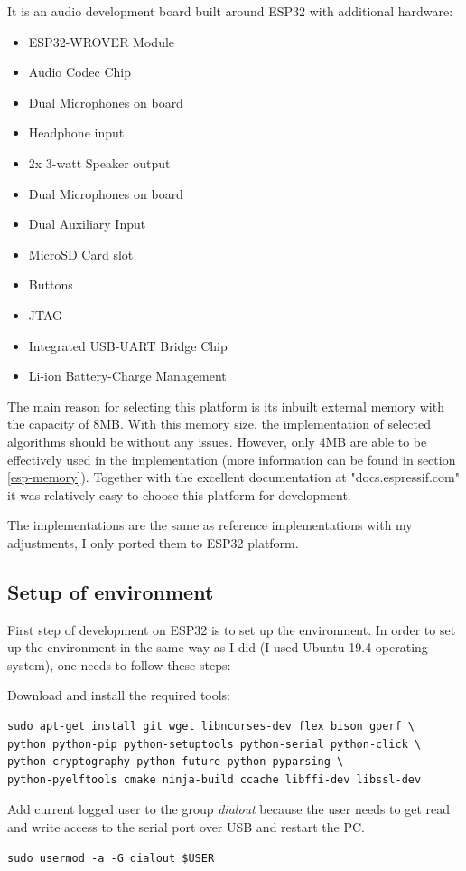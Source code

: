 \documentclass[thesis=M,english]{FITthesis}[2019/12/23]
\begin{document}
It is an audio development board built around ESP32 with additional hardware:
\begin{itemize}
\item	ESP32-WROVER Module
\item	Audio Codec Chip
\item	Dual Microphones on board
\item	Headphone input
\item	2x 3-watt Speaker output
\item	Dual Microphones on board
\item	Dual Auxiliary Input
\item	MicroSD Card slot
\item	Buttons
\item	JTAG
\item	Integrated USB-UART Bridge Chip
\item	Li-ion Battery-Charge Management
\end{itemize}
The main reason for selecting this platform is its inbuilt external memory with the capacity of 8MB. With this memory size, the implementation of selected algorithms should be without any issues. However, only 4MB are able to be effectively used in the implementation (more information can be found in section \ref{esp-memory}). Together with the excellent documentation at "docs.espressif.com" it was relatively easy to choose this platform for development.

\bigskip
\noindent
The implementations are the same as reference implementations with my adjustments, I only ported them to ESP32 platform.

\subsection{Setup of environment}
First step of development on ESP32 is to set up the environment. In order to set up the environment in the same way as I did (I used Ubuntu 19.4 operating system), one needs to follow these steps:

\bigskip
\noindent
Download and install the required tools:
\begin{lstlisting}[frame=single]
sudo apt-get install git wget libncurses-dev flex bison gperf \
python python-pip python-setuptools python-serial python-click \
python-cryptography python-future python-pyparsing \
python-pyelftools cmake ninja-build ccache libffi-dev libssl-dev
\end{lstlisting}

\bigskip
\noindent
Add current logged user to the group \textit{dialout} because the user needs to get read and write access to the serial port over USB and restart the PC.
\begin{lstlisting}[frame=single]
sudo usermod -a -G dialout $USER
\end{lstlisting}
\end{document}
